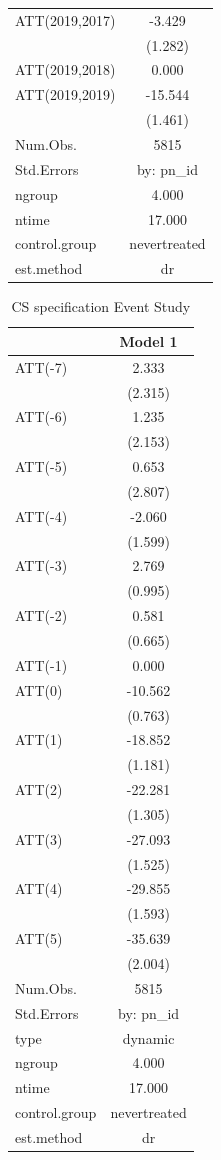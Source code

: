 \documentclass[
  12pt,
]{article}
\begin{document}
\begin{table}
\begin{tabular}[t]{lc}
ATT(2019,2017) & -3.429\\
 & (1.282)\\
ATT(2019,2018) & 0.000\\
ATT(2019,2019) & -15.544\\
 & (1.461)\\
\midrule
Num.Obs. & 5815\\
Std.Errors & by: pn\_id\\
ngroup & 4.000\\
ntime & 17.000\\
control.group & nevertreated\\
est.method & dr\\
\bottomrule
\end{tabular}
\end{table}

\begin{table}

\caption{\label{tab:table-4}CS specification Event Study}
\centering
\begin{tabular}[t]{lc}
\toprule
  & Model 1\\
\midrule
ATT(-7) & 2.333\\
 & (2.315)\\
ATT(-6) & 1.235\\
 & (2.153)\\
ATT(-5) & 0.653\\
 & (2.807)\\
ATT(-4) & -2.060\\
 & (1.599)\\
ATT(-3) & 2.769\\
 & (0.995)\\
ATT(-2) & 0.581\\
 & (0.665)\\
ATT(-1) & 0.000\\
ATT(0) & -10.562\\
 & (0.763)\\
ATT(1) & -18.852\\
 & (1.181)\\
ATT(2) & -22.281\\
 & (1.305)\\
ATT(3) & -27.093\\
 & (1.525)\\
ATT(4) & -29.855\\
 & (1.593)\\
ATT(5) & -35.639\\
 & (2.004)\\
\midrule
Num.Obs. & 5815\\
Std.Errors & by: pn\_id\\
type & dynamic\\
ngroup & 4.000\\
ntime & 17.000\\
control.group & nevertreated\\
est.method & dr\\
\bottomrule
\end{tabular}
\end{table}
\end{document}
